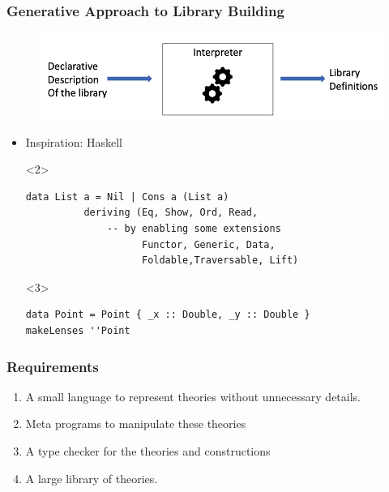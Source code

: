 \documentclass[t,10pt,numbers,fleqn,usenames,xcolor=dvipsnames]{beamer}
\begin{document}


\begin{frame}[fragile]
\frametitle{Generative Approach to Library Building}
\begin{figure}
    \includegraphics[scale=0.3]{figures/interpreter_small.png}
\end{figure}
\pause
\begin{itemize}
    \item Inspiration: Haskell  
\begin{onlyenv}<2>
    \begin{verbatim}
data List a = Nil | Cons a (List a) 
          deriving (Eq, Show, Ord, Read,
              -- by enabling some extensions 
                    Functor, Generic, Data,         
                    Foldable,Traversable, Lift)
    \end{verbatim}
\end{onlyenv}    
\begin{onlyenv}<3>
    \begin{verbatim}
data Point = Point { _x :: Double, _y :: Double }
makeLenses ''Point  
     \end{verbatim}
\end{onlyenv}     
\end{itemize}
\end{frame}

\begin{frame}[fragile]
\frametitle{Requirements}
\begin{enumerate}
\item A small language to represent theories without unnecessary details. 
\item Meta programs to manipulate these theories  
\item A type checker for the theories and constructions 
\item A large library of theories.
\end{enumerate}
\end{frame}
\end{document}
